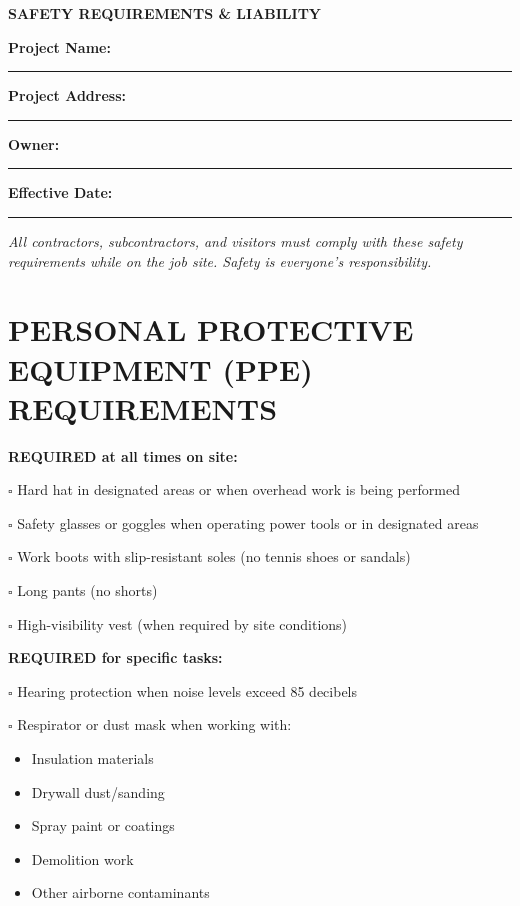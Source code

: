 \documentclass[11pt,letterpaper]{article}
\begin{document}
\begin{center}
\textbf{\Large SAFETY REQUIREMENTS \& LIABILITY}
\end{center}

\vspace{12pt}

\textbf{Project Name:} \rule{8cm}{0.4pt}

\textbf{Project Address:} \rule{8cm}{0.4pt}

\textbf{Owner:} \rule{9cm}{0.4pt}

\textbf{Effective Date:} \rule{4cm}{0.4pt}

\vspace{6pt}

\textit{All contractors, subcontractors, and visitors must comply with these safety requirements while on the job site. Safety is everyone's responsibility.}

\vspace{12pt}

\section*{PERSONAL PROTECTIVE EQUIPMENT (PPE) REQUIREMENTS}

\textbf{REQUIRED at all times on site:}

$\square$ Hard hat in designated areas or when overhead work is being performed

$\square$ Safety glasses or goggles when operating power tools or in designated areas

$\square$ Work boots with slip-resistant soles (no tennis shoes or sandals)

$\square$ Long pants (no shorts)

$\square$ High-visibility vest (when required by site conditions)

\vspace{6pt}

\textbf{REQUIRED for specific tasks:}

$\square$ Hearing protection when noise levels exceed 85 decibels

$\square$ Respirator or dust mask when working with:
\begin{itemize}[leftmargin=0.75in]
\item Insulation materials
\item Drywall dust/sanding
\item Spray paint or coatings
\item Demolition work
\item Other airborne contaminants
\end{itemize}
\end{document}
